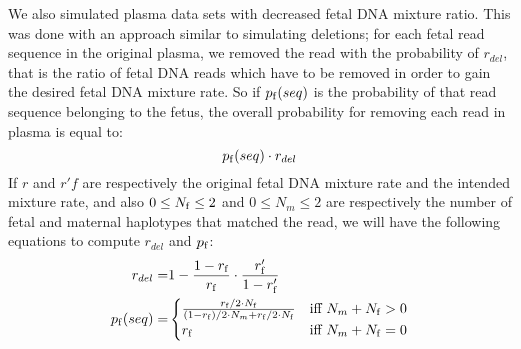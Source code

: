 	We also simulated plasma data sets with decreased fetal DNA mixture ratio. This was done with an approach similar to simulating deletions; for each fetal read sequence in the original plasma, we removed the read with the probability of $r_{del}$, that is the ratio of fetal DNA reads which have to be removed in order to gain the desired fetal DNA mixture rate. So if $p_{\mathrm{f}}(seq)$ is the probability of that read sequence belonging to the fetus, the overall probability for removing each read in plasma is equal to:
	 $$p_{\mathrm{f}}(seq) \cdot r_{del}$$
	 If $r$ and $r'f$ are respectively the original fetal DNA mixture rate and the intended mixture rate, and also $0 \leq N_{\mathrm{f}} \leq 2$ and $0 \leq N_m \leq 2$ are respectively the number of fetal and maternal haplotypes that matched the read, we will have the following equations to compute $r_{del}$ and $p_{\mathrm{f}}$:
\begin{align*}
r_{del} =& 1 - \frac{1 - r_{\mathrm{f}} } { r_{\mathrm{f}}} \cdot \frac{r'_{\mathrm{f}}}{1-r'_{\mathrm{f}}}  \\
p_{\mathrm{f}}(seq) =& 
  \begin{cases}
    \frac{ r_{\mathrm{f}}/2 \cdot N_{\mathrm{f}} } { (1-r_{\mathrm{f}})/2 \cdot N_m + r_{\mathrm{f}}/2 \cdot N_{\mathrm{f}}} & \text{iff } N_m+N_{\mathrm{f}}>0 \\
    r_{\mathrm{f}} & \text{iff } N_m+N_{\mathrm{f}}=0
  \end{cases}
\end{align*}

